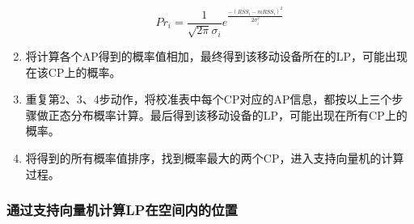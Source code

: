 \documentclass[UTF8, twocolumn ]{ctexart}
\begin{document}
\begin{enumerate}
  \begin{displaymath}
    Pr_{i}=\frac{1}{\sqrt{2\pi}\sigma_{i}}e^{\frac{-(RSS_{i}-mRSS_{i})^{2}}{2\sigma_{i}^{2}}}
  \end{displaymath}
\item 将计算各个AP得到的概率值相加，最终得到该移动设备所在的LP，可能出现在该CP上的概率。
\item 重复第2、3、4步动作，将校准表中每个CP对应的AP信息，都按以上三个步骤做正态分布概率计算。最后得到该移动设备的LP，可能出现在所有CP上的概率。
\item 将得到的所有概率值排序，找到概率最大的两个CP，进入支持向量机的计算过程。
\end{enumerate}

\subsubsection{通过支持向量机计算LP在空间内的位置}
\end{document}
